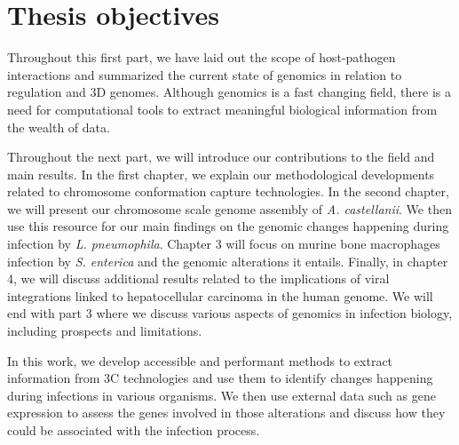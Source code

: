 
\chapter{Thesis objectives} %

\label{ch:01-04} %

Throughout this first part, we have laid out the scope of host-pathogen interactions and summarized the current state of genomics in relation to regulation and 3D genomes. Although genomics is a fast changing field, there is a need for computational tools to extract meaningful biological information from the wealth of data.

Throughout the next part, we will introduce our contributions to the field and main results. In the first chapter, we explain our methodological developments related to chromosome conformation capture technologies. In the second chapter, we will present our chromosome scale genome assembly of \textit{A. castellanii}. We then use this resource for our main findings on the genomic changes happening during infection by \textit{L. pneumophila}. Chapter 3 will focus on murine bone macrophages infection by \textit{S. enterica} and the genomic alterations it entails. Finally, in chapter 4, we will discuss additional results related to the implications of viral integrations linked to hepatocellular carcinoma in the human genome. We will end with part 3 where we discuss various aspects of genomics in infection biology, including prospects and limitations.

In this work, we develop accessible and performant methods to extract information from 3C technologies and use them to identify changes happening during infections in various organisms. We then use external data such as gene expression to assess the genes involved in those alterations and discuss how they could be associated with the infection process.

